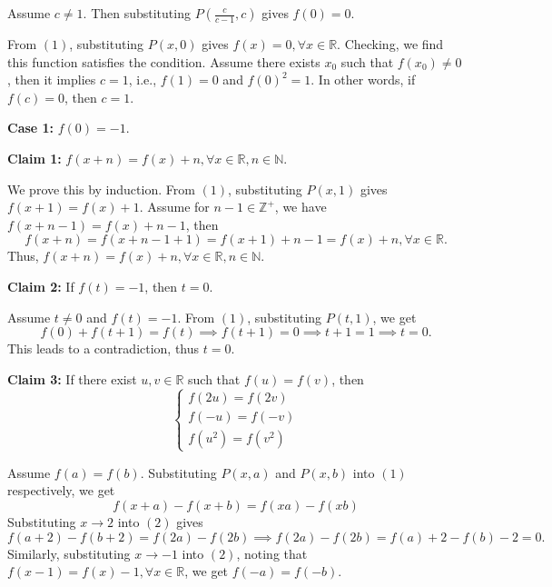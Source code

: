 \documentclass[11pt]{scrartcl}
\begin{document}
\begin{itemize}[label=, leftmargin=0em, itemsep=0.2em]
\begin{sol}
            Assume \( c \neq 1 \). Then substituting \( P\left(\frac{c}{c - 1},c\right) \) gives \( f(0) = 0 \).
            
            From \((1)\), substituting \( P(x,0) \) gives \( f(x) = 0, \forall x \in \mathbb{R} \). Checking, we find this function satisfies the condition. Assume there exists \( x_0 \) such that \( f(x_0) \neq 0 \), then it implies \( c = 1 \), i.e., \( f(1) = 0 \) and \( f(0)^2 = 1 \). In other words, if \( f(c) = 0 \), then \( c = 1 \).
            
            \textbf{Case 1:} \( f(0) = -1 \).
            
            \textbf{Claim 1:} \( f(x + n) = f(x) + n, \forall x \in \mathbb{R}, n \in \mathbb{N} \).
            
            \begin{pro}
            We prove this by induction.
            From \((1)\), substituting \( P(x,1) \) gives \( f(x + 1) = f(x) + 1 \). Assume for \( n - 1 \in \mathbb{Z}^+ \), we have \( f(x + n - 1) = f(x) + n - 1 \), then 
            \[
            f(x + n) = f(x + n - 1 + 1) = f(x + 1) + n - 1 = f(x) + n , \forall x \in \mathbb{R}.
            \]
            Thus, \( f(x + n) = f(x) + n, \forall x \in \mathbb{R}, n \in \mathbb{N} \).
            \end{pro}
            
            \textbf{Claim 2:} If \( f(t) = -1 \), then \( t = 0 \).
            
            \begin{pro}
            Assume \( t \neq 0 \) and \( f(t) = -1 \). From \((1)\), substituting \( P(t, 1) \), we get
            \[
            f(0) + f(t + 1) = f(t)
            \implies f(t + 1) = 0
            \implies t + 1 = 1
            \implies t = 0.
            \]
            This leads to a contradiction, thus \( t = 0 \).
            \end{pro}
            
            \textbf{Claim 3:} If there exist \( u,v \in \mathbb{R} \) such that \( f(u) = f(v) \), then
            \[
            \left\{
            \begin{array}{l}
            f(2u) = f(2v) \\
            f(-u) = f(-v) \\
            f(u^2) = f(v^2)
            \end{array}
            \right.
            \]
            
            \begin{pro}
            Assume \( f(a) = f(b) \). Substituting \( P(x,a) \) and \( P(x,b) \) into \((1)\) respectively, we get 
            \[
            f(x + a) - f(x + b) = f(xa) - f(xb) \tag{2}
            \]
            Substituting \( x \to 2 \) into \((2)\) gives
            \[
            f(a + 2) - f(b + 2) = f(2a) - f(2b) \implies f(2a) - f(2b) = f(a) + 2 - f(b) - 2 = 0.
            \]
            Similarly, substituting \( x \to -1 \) into \((2)\), noting that \( f(x - 1) = f(x) - 1, \forall x \in \mathbb{R} \), we get \( f(-a) = f(-b) \).
            

\end{pro}
\end{sol}
\end{itemize}
\end{document}
